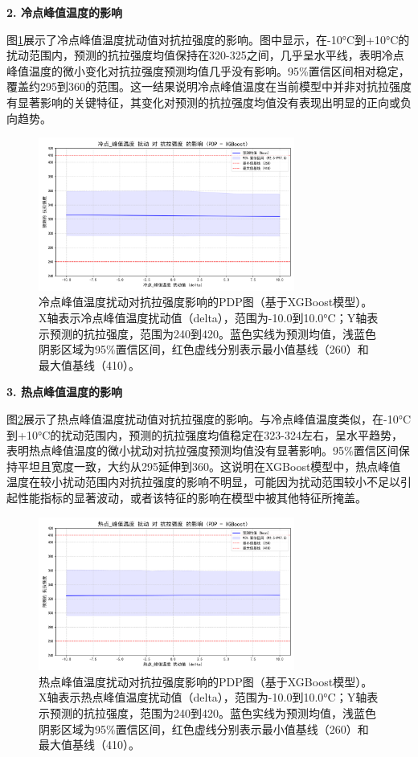\documentclass[12pt,a4paper]{article}
\begin{document}
\textbf{2. 冷点峰值温度的影响}

图\ref{fig:pdp_lengdian}展示了冷点峰值温度扰动值对抗拉强度的影响。图中显示，在-10°C到+10°C的扰动范围内，预测的抗拉强度均值保持在320-325之间，几乎呈水平线，表明冷点峰值温度的微小变化对抗拉强度预测均值几乎没有影响。95\%置信区间相对稳定，覆盖约295到360的范围。这一结果说明冷点峰值温度在当前模型中并非对抗拉强度有显著影响的关键特征，其变化对预测的抗拉强度均值没有表现出明显的正向或负向趋势。

\begin{figure}[H]
\centering
\includegraphics[width=0.75\textwidth]{fig/02b_pdp_plot_cold_spot_temp_vs_tensile_strength.png}
\caption{冷点峰值温度扰动对抗拉强度影响的PDP图（基于XGBoost模型）。X轴表示冷点峰值温度扰动值（delta），范围为-10.0到10.0°C；Y轴表示预测的抗拉强度，范围为240到420。蓝色实线为预测均值，浅蓝色阴影区域为95\%置信区间，红色虚线分别表示最小值基线（260）和最大值基线（410）。}
\label{fig:pdp_lengdian}
\end{figure}

\textbf{3. 热点峰值温度的影响}

图\ref{fig:pdp_redian}展示了热点峰值温度扰动值对抗拉强度的影响。与冷点峰值温度类似，在-10°C到+10°C的扰动范围内，预测的抗拉强度均值稳定在323-324左右，呈水平趋势，表明热点峰值温度的微小扰动对抗拉强度预测均值没有显著影响。95\%置信区间保持平坦且宽度一致，大约从295延伸到360。这说明在XGBoost模型中，热点峰值温度在较小扰动范围内对抗拉强度的影响不明显，可能因为扰动范围较小不足以引起性能指标的显著波动，或者该特征的影响在模型中被其他特征所掩盖。

\begin{figure}[H]
\centering
\includegraphics[width=0.75\textwidth]{fig/02b_pdp_plot_hot_spot_temp_vs_tensile_strength.png}
\caption{热点峰值温度扰动对抗拉强度影响的PDP图（基于XGBoost模型）。X轴表示热点峰值温度扰动值（delta），范围为-10.0到10.0°C；Y轴表示预测的抗拉强度，范围为240到420。蓝色实线为预测均值，浅蓝色阴影区域为95\%置信区间，红色虚线分别表示最小值基线（260）和最大值基线（410）。}
\label{fig:pdp_redian}
\end{figure}
\end{document}
